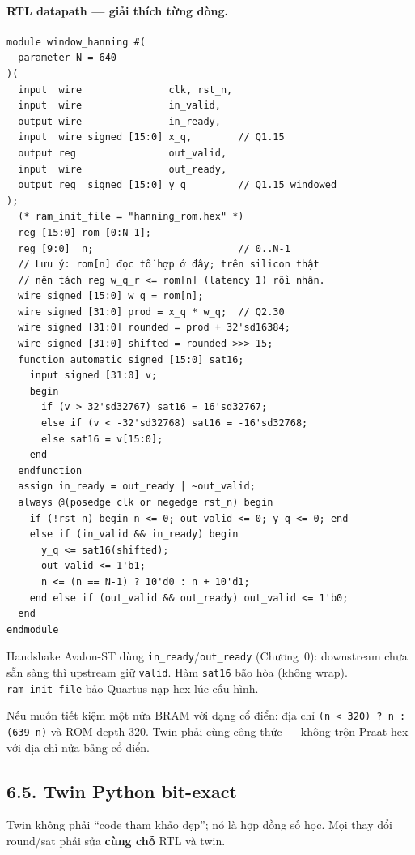\paragraph{RTL datapath --- giải thích từng dòng.}
\begin{verbatim}
module window_hanning #(
  parameter N = 640
)(
  input  wire               clk, rst_n,
  input  wire               in_valid,
  output wire               in_ready,
  input  wire signed [15:0] x_q,        // Q1.15
  output reg                out_valid,
  input  wire               out_ready,
  output reg  signed [15:0] y_q         // Q1.15 windowed
);
  (* ram_init_file = "hanning_rom.hex" *)
  reg [15:0] rom [0:N-1];
  reg [9:0]  n;                         // 0..N-1
  // Lưu ý: rom[n] đọc tổ hợp ở đây; trên silicon thật
  // nên tách reg w_q_r <= rom[n] (latency 1) rồi nhân.
  wire signed [15:0] w_q = rom[n];
  wire signed [31:0] prod = x_q * w_q;  // Q2.30
  wire signed [31:0] rounded = prod + 32'sd16384;
  wire signed [31:0] shifted = rounded >>> 15;
  function automatic signed [15:0] sat16;
    input signed [31:0] v;
    begin
      if (v > 32'sd32767) sat16 = 16'sd32767;
      else if (v < -32'sd32768) sat16 = -16'sd32768;
      else sat16 = v[15:0];
    end
  endfunction
  assign in_ready = out_ready | ~out_valid;
  always @(posedge clk or negedge rst_n) begin
    if (!rst_n) begin n <= 0; out_valid <= 0; y_q <= 0; end
    else if (in_valid && in_ready) begin
      y_q <= sat16(shifted);
      out_valid <= 1'b1;
      n <= (n == N-1) ? 10'd0 : n + 10'd1;
    end else if (out_valid && out_ready) out_valid <= 1'b0;
  end
endmodule
\end{verbatim}
Handshake Avalon-ST dùng \texttt{in\_ready}/\texttt{out\_ready} (Chương~0):
downstream chưa sẵn sàng thì upstream giữ \texttt{valid}.
Hàm \texttt{sat16} bão hòa (không wrap).
\texttt{ram\_init\_file} bảo Quartus nạp hex lúc cấu hình.

Nếu muốn tiết kiệm một nửa BRAM với dạng cổ điển: địa chỉ
\texttt{(n < 320) ? n : (639-n)} và ROM depth 320.
Twin phải cùng công thức --- không trộn Praat hex với địa chỉ nửa bảng cổ điển.

\subsection*{6.5. Twin Python bit-exact}

Twin không phải ``code tham khảo đẹp''; nó là hợp đồng số học. Mọi thay đổi round/sat phải sửa \textbf{cùng chỗ} RTL và twin.

